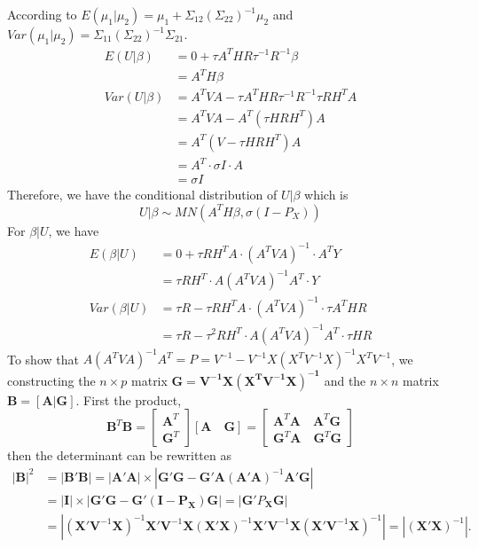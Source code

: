 \documentclass[12pt]{article}
\begin{document}
    According to $E(\mu_1|\mu_2)=\mu_1+\Sigma_{12}(\Sigma_{22})^{-1}\mu_2$ and $Var(\mu_1|\mu_2)=\Sigma_{11}(\Sigma_{22})^{-1}\Sigma_{21}$.\\
    \begin{align*}
        E(U|\beta)&=0+\tau A^THR\tau^{-1}R^{-1}\beta\\
        &=A^TH\beta\\
        Var(U|\beta)&=A^TVA-\tau A^THR\tau^{-1}R^{-1}\tau RH^TA\\
        &=A^TVA-A^T(\tau HRH^T)A\\
        &=A^T(V-\tau HRH^T)A\\
        &=A^T\cdot \sigma I\cdot A\\
        &=\sigma I        
    \end{align*}
    Therefore, we have the conditional distribution of $U|\beta$ which is
    \begin{equation*}
    U|\beta\sim MN(A^TH\beta,\sigma(I-P_X))
    \end{equation*}
    For $\beta|U$, we have
    \begin{align*}
        E(\beta|U)&=0+\tau RH^TA\cdot(A^TVA)^{-1}\cdot A^TY\\
        &=\tau RH^T\cdot A(A^TVA)^{-1}A^T\cdot Y\\
        Var(\beta|U)&=\tau R-\tau RH^TA\cdot(A^TVA)^{-1}\cdot \tau A^THR\\
        &=\tau R-\tau^2 RH^T\cdot A(A^TVA)^{-1}A^T\cdot \tau HR
    \end{align*}
    To show that $A(A^TVA)^{-1}A^T=P=V^{-1}-V^{-1}X(X^TV^{-1}X)^{-1}X^TV^{-1}$, we constructing the $n\times p$ matrix $\mathbf{G=V^{-1}X(X^TV^{-1}X)^{-1}}$ and the $n\times n$ matrix $\mathbf{B=[A|G]}$. First the product,
    \begin{equation*}
    \textbf{B}^T\textbf{B}=\begin{bmatrix}
        \textbf{A}^T\\
        \textbf{G}^T
        \end{bmatrix}
        [\mathbf{A}\quad \mathbf{G}]=\begin{bmatrix}
        \mathbf{A}^T\mathbf{A} \quad \mathbf{A}^T\mathbf{G}\\
        \mathbf{G}^T\mathbf{A} \quad \mathbf{G}^T\mathbf{G}
        \end{bmatrix}
    \end{equation*}
    then the determinant can be rewritten as
    \begin{equation*}
    \begin{split}
    |\textbf{B}|^2&=|\textbf{B}'\textbf{B}|=|\mathbf{A}'\mathbf{A}|\times|\mathbf{G}'\mathbf{G}-\mathbf{G}'\mathbf{A}(\mathbf{A}'\mathbf{A})^{-1}\mathbf{A}'\mathbf{G}|\\
    &=|\textbf{I}|\times|\mathbf{G}'\mathbf{G}-\mathbf{G}'(\mathbf{I-P_X})\mathbf{G}|=|\mathbf{G}'P_\mathbf{X}\mathbf{G}|\\
    &=|(\mathbf{X}'\mathbf{V}^{-1}\mathbf{X})^{-1}\mathbf{X}'\mathbf{V}^{-1}\mathbf{X}(\mathbf{X}'\mathbf{X})^{-1}\mathbf{X}'\mathbf{V}^{-1}\mathbf{X}(\mathbf{X}'\mathbf{V}^{-1}\mathbf{X})^{-1}|=|(\mathbf{X}'\mathbf{X})^{-1}|.
    \end{split}
    \end{equation*}
\end{document}

